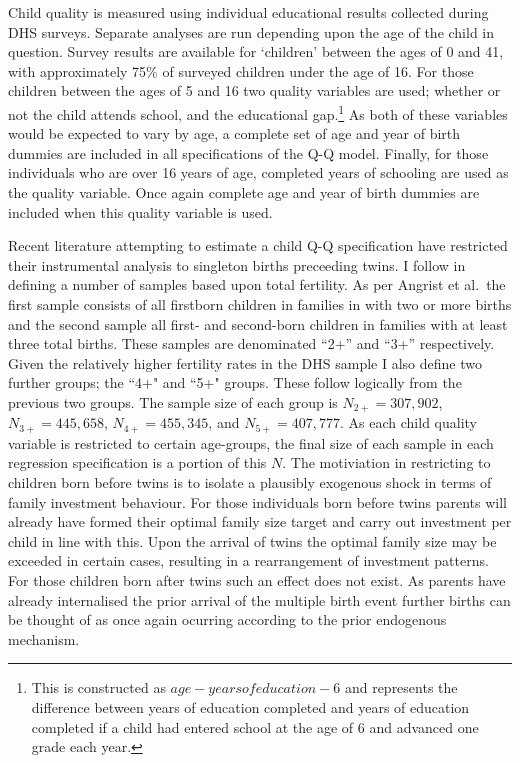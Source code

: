 \documentclass{article}[11pt,subeqn]
\begin{document}
\begin{spacing}{1.25}
Child quality is measured using individual educational results collected during DHS surveys.  Separate analyses are run depending upon the age of the child in question.  Survey results are available for `children' between the ages of 0 and 41, with approximately 75\% of surveyed children under the age of 16.  For those children between the ages of 5 and 16 two quality variables are used; whether or not the child attends school, and the educational gap.\footnote{This is constructed as $age-years of education - 6$ and represents the difference between years of education completed and years of education completed if a child had entered school at the age of 6 and advanced one grade each year.}  As both of these variables would be expected to vary by age, a complete set of age and year of birth dummies are included in all specifications of the Q-Q model.  Finally, for those individuals who are over 16 years of age, completed years of schooling are used as the quality variable.  Once again complete age and year of birth dummies are included when this quality variable is used.

Recent literature attempting to estimate a child Q-Q specification have restricted their instrumental analysis to singleton births preceeding twins.  I follow \citet{Angristetal2010} in defining a number of samples based upon total fertility.  As per Angrist et al.\ the first sample consists of all firstborn children in families in with two or more births and the second sample all first- and second-born children in families with at least three total births.  These samples are denominated ``2+'' and ``3+'' respectively.  Given the relatively higher fertility rates in the DHS sample I also define two further groups; the ``4+" and ``5+" groups.  These follow logically from the previous two groups.  The sample size of each group is $N_{2+}= 307,902$, $N_{3+}=445,658$, $N_{4+}= 455,345$, and $N_{5+}=407,777$.  As each child quality variable is restricted to certain age-groups, the final size of each sample in each regression specification is a portion of this $N$.  The motiviation in restricting to children born before twins is to isolate a plausibly exogenous shock in terms of family investment behaviour.  For those individuals born before twins parents will already have formed their optimal family size target and carry out investment per child in line with this.  Upon the arrival of twins the optimal family size may be exceeded in certain cases, resulting in a rearrangement of investment patterns.  For those children born after twins such an effect does not exist.  As parents have already internalised the prior arrival of the multiple birth event further births can be thought of as once again ocurring according to the prior endogenous mechanism.


\end{spacing}
\end{document}
